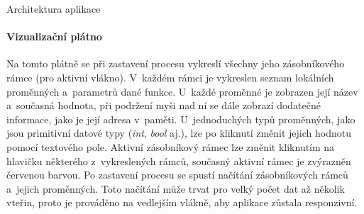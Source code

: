 \documentclass[czech,bachelor,male,python,dept460,hidelinks]{diploma}						%
\begin{document}
\begin{section}{Architektura aplikace}
	\paragraph*{Vizualizační plátno} Na tomto plátně se při zastavení procesu vykreslí všechny jeho zásobníkového rámce (pro aktivní vlákno). V~každém rámci je
		vykreslen seznam lokálních proměnných a~parametrů dané funkce. U~každé proměnné je zobrazen její název a~současná hodnota, při podržení myši nad ní se dále
		zobrazí dodatečné informace, jako je její adresa v~paměti. U~jednoduchých typů proměnných, jako jsou primitivní datové typy (\textit{int}, \textit{bool}
		aj.), lze po kliknutí změnit jejich hodnotu pomocí textového pole. Aktivní zásobníkový rámec lze změnit kliknutím na hlavičku některého z~vykreslených
		rámců, současný aktivní rámec je zvýrazněn červenou barvou. Po zastavení procesu se spustí načítání zásobníkových
		rámců a~jejich proměnných. Toto načítání může trvat pro velký počet dat až několik vteřin, proto je prováděno na vedlejším vlákně, aby aplikace
		zůstala responzivní.
		
\end{section}
\end{document}
